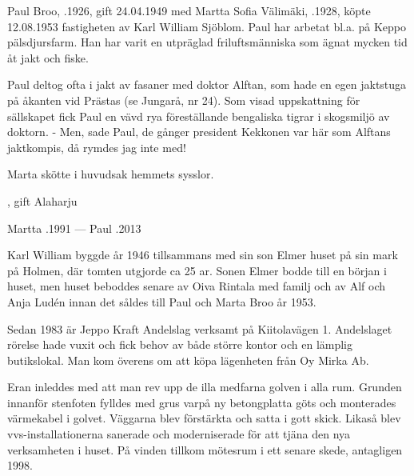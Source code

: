 
%
Paul Broo, .1926, gift 24.04.1949 med Martta Sofia Välimäki, .1928, köpte 12.08.1953 fastigheten av Karl William Sjöblom. Paul har arbetat bl.a. på Keppo pälsdjursfarm. Han har varit en utpräglad friluftsmänniska som ägnat mycken tid åt jakt och fiske.

Paul deltog ofta i jakt av fasaner med doktor Alftan, som hade en egen jaktstuga på åkanten vid Prästas (se Jungarå, nr 24). Som visad uppskattning för sällskapet fick Paul en vävd rya föreställande bengaliska tigrar i skogsmiljö av doktorn. - Men, sade Paul, de gånger president Kekkonen var här som Alftans jaktkompis, då rymdes jag inte med!

Marta skötte i huvudsak hemmets sysslor.
\begin{jhchildren}
  \item {}, gift Alaharju
  \item {}
\end{jhchildren}

Martta .1991  ---  Paul .2013


%
Karl William byggde år 1946 tillsammans med sin son Elmer huset på sin mark på Holmen, där tomten utgjorde ca 25 ar. Sonen Elmer bodde till en början i huset, men huset beboddes senare av Oiva Rintala med familj och av Alf och Anja Ludén innan det såldes till Paul och Marta Broo år 1953.



%



%
Sedan 1983 är Jeppo Kraft Andelslag verksamt på Kiitolavägen 1. Andelslaget rörelse hade vuxit och fick behov av både större kontor och en lämplig butikslokal. Man kom överens om att köpa lägenheten från Oy Mirka Ab.

Eran inleddes med att man rev upp de illa medfarna golven i alla rum. Grunden innanför stenfoten fylldes med grus varpå ny betongplatta göts och monterades värmekabel i golvet. Väggarna blev förstärkta och satta i gott skick. Likaså blev vvs-installationerna sanerade och moderniserade för att tjäna den nya verksamheten i huset. På vinden tillkom mötesrum i ett senare skede, antagligen 1998.

